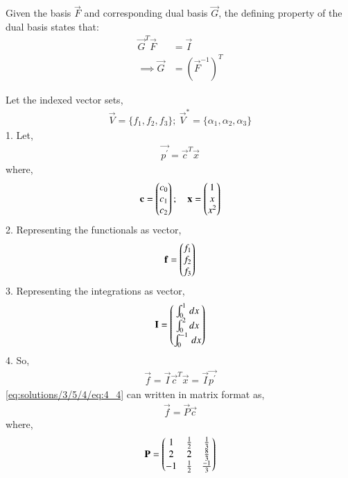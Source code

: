 Given the basis $\vec{F}$ and corresponding dual basis $\vec{G}$, the defining property of the dual basis states that:
\begin{align}
    \vec{G}^T \vec{F} &= \vec{I} \nonumber \\
    \implies \vec{G} &= (\vec{F}^{-1})^T \label{eq:solutions/3/5/4/eq:2_1}
\end{align}

Let the indexed vector sets,
\begin{align}
    \vec{V} = \{f_1, f_2, f_3\}; \: \vec{V}^* = \{\alpha_1, \alpha_2, \alpha_3\} \nonumber 
\end{align}
1. Let,
\begin{align}
    \vec{p^\prime} = \vec{c}^T\vec{x} \label{eq:solutions/3/5/4/eq:4_1}
\end{align}
where,
\begin{align}
    \mathbf{c} = \begin{pmatrix}c_0 \\ c_1 \\ c_2\end{pmatrix}; \quad 
    \mathbf{x} = \begin{pmatrix}1 \\ x \\ x^2\end{pmatrix} \nonumber
\end{align}
2. Representing the functionals as vector,
\begin{align}
    \mathbf{f} = \begin{pmatrix}f_1 \\ f_2 \\ f_3\end{pmatrix} \label{eq:solutions/3/5/4/eq:4_2}
\end{align}
3. Representing the integrations as vector,
\begin{align}
    \mathbf{I} = \begin{pmatrix}\int_{0}^{1} \, dx \\ \int_{0}^{2} \, dx \\
    \int_{0}^{-1} \, dx\end{pmatrix} \label{eq:solutions/3/5/4/eq:4_3}
\end{align}
4. So,
\begin{align}
    \vec{f} = \vec{I} \vec{c}^T \vec{x} = \vec{I} \vec{p^\prime} \label{eq:solutions/3/5/4/eq:4_4}
\end{align}
\eqref{eq:solutions/3/5/4/eq:4_4} can written in matrix format as,
\begin{align}
    \vec{f} = \vec{P} \vec{c} \label{eq:solutions/3/5/4/eq:4_5}
\end{align}
where,
\begin{align}
    \mathbf{P}  = \begin{pmatrix}1 & \frac{1}{2} & \frac{1}{3} \\ 2 & 2 & \frac{8}{3} \\ -1 & \frac{1}{2} & \frac{-1}{3}\end{pmatrix} \label{eq:solutions/3/5/4/eq:4_6}
\end{align}
